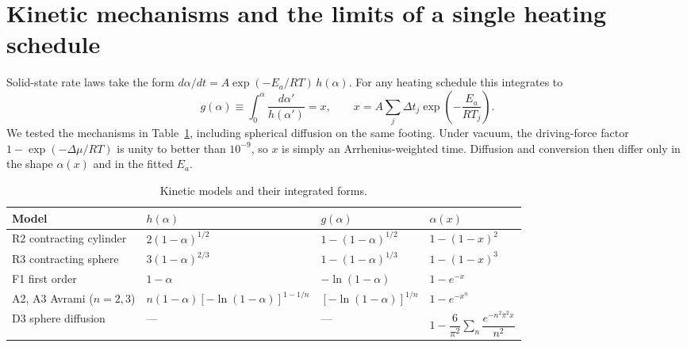 
\section{Kinetic mechanisms and the limits of a single heating schedule}
\label{sec:gt_supp_mech}

Solid-state rate laws take the form $d\alpha/dt = A\exp(-E_a/RT)\,h(\alpha)$. For any heating
schedule this integrates to
\begin{equation}
  g(\alpha) \equiv \int_0^{\alpha}\frac{d\alpha'}{h(\alpha')} = x,
  \qquad
  x = A\sum_j \Delta t_j\exp\!\left(-\frac{E_a}{RT_j}\right).
\end{equation}
We tested the mechanisms in Table~\ref{tab:gt_mech_forms}, including spherical diffusion on the
same footing. Under vacuum, the driving-force factor $1-\exp(-\Delta\mu/RT)$ is unity to better
than $10^{-9}$, so $x$ is simply an Arrhenius-weighted time. Diffusion and conversion then
differ only in the shape $\alpha(x)$ and in the fitted $E_a$.

\begin{table}
  \centering
  \caption{Kinetic models and their integrated forms.}
  \label{tab:gt_mech_forms}
  \begin{tabular}{llll}
    \hline
    Model & $h(\alpha)$ & $g(\alpha)$ & $\alpha(x)$ \\
    \hline
    R2 contracting cylinder & $2(1-\alpha)^{1/2}$ & $1-(1-\alpha)^{1/2}$ & $1-(1-x)^2$ \\
    R3 contracting sphere & $3(1-\alpha)^{2/3}$ & $1-(1-\alpha)^{1/3}$ & $1-(1-x)^3$ \\
    F1 first order & $1-\alpha$ & $-\ln(1-\alpha)$ & $1-e^{-x}$ \\
    A2, A3 Avrami ($n=2,3$) & $n(1-\alpha)[-\ln(1-\alpha)]^{1-1/n}$ & $[-\ln(1-\alpha)]^{1/n}$ & $1-e^{-x^n}$ \\
    D3 sphere diffusion & --- & --- & $1-\dfrac{6}{\pi^2}\displaystyle\sum_n \dfrac{e^{-n^2\pi^2 x}}{n^2}$ \\
    \hline
  \end{tabular}
\end{table}

